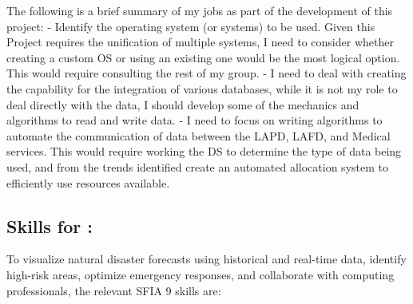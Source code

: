 \documentclass[a4paper, 11pt]{report}
\begin{document}
The following is a brief summary of my jobs as part of the development of this project:
- Identify the operating system (or systems) to be used. Given this Project requires the unification of multiple systems, I need to consider whether creating a custom OS or using an existing one would be the most logical option. This would require consulting the rest of my group. 
- I need to deal with creating the capability for the integration of various databases, while it is not my role to deal directly with the data, I should develop some of the mechanics and algorithms to read and write data. 
- I need to focus on writing algorithms to automate the communication of data between the LAPD, LAFD, and Medical services. This would require working the DS to determine the type of data being used, and from the trends identified create an automated allocation system to efficiently use resources available. 


\subsection{Skills for \majB: \studB}

To visualize natural disaster forecasts using historical and real-time data, identify high-risk areas, optimize emergency responses, and collaborate with computing professionals, the relevant SFIA 9 skills are:
\end{document}
